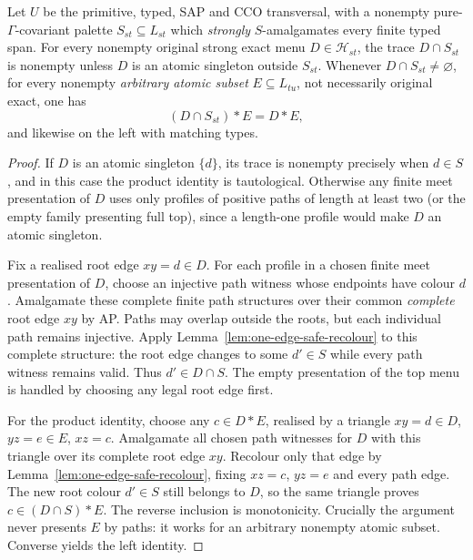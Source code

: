 \begin{lemma}
\label{lem:safe-trace-product}
Let $U$ be the primitive, typed, SAP and CCO transversal,
with a nonempty pure-$\Gamma$-covariant palette
$S_{st}\subseteq L_{st}$ which \emph{strongly}
$S$-amalgamates every finite typed span.
For every nonempty original strong exact menu $D\in\mathcal H_{st}$,
the trace $D\cap S_{st}$ is nonempty unless $D$ is
an atomic singleton outside $S_{st}$.  Whenever
$D\cap S_{st}\ne\varnothing$, for every nonempty
\emph{arbitrary atomic subset} $E\subseteq L_{tu}$, not
necessarily original exact, one has
\[
          (D\cap S_{st})*E=D*E,
\]
and likewise on the left with matching types.
\end{lemma}
\begin{proof}
If $D$ is an atomic singleton $\{d\}$, its trace is
nonempty precisely when $d\in S$, and in this case the
product identity is tautological.  Otherwise any finite
meet presentation of $D$ uses only profiles of positive
paths of length at least two (or the empty family presenting
full top), since a length-one profile would make $D$
an atomic singleton.

Fix a realised root edge $xy=d\in D$.  For each profile in
a chosen finite meet presentation of $D$, choose an injective
path witness whose endpoints have colour $d$.  Amalgamate
these complete finite path structures over their common
\emph{complete} root edge $xy$ by AP.  Paths may overlap
outside the roots, but each individual path remains injective.
Apply Lemma~\ref{lem:one-edge-safe-recolour} to this
complete structure: the root edge changes to some
$d'\in S$ while every path witness remains valid.  Thus
$d'\in D\cap S$.  The empty presentation of the top
menu is handled by choosing any legal root edge first.

For the product identity, choose any $c\in D*E$, realised
by a triangle $xy=d\in D$, $yz=e\in E$, $xz=c$.
Amalgamate all chosen path witnesses for $D$ with this
triangle over its complete root edge $xy$.  Recolour only
that edge by Lemma~\ref{lem:one-edge-safe-recolour},
fixing $xz=c$, $yz=e$ and every path edge.  The new
root colour $d'\in S$ still belongs to $D$, so the
same triangle proves $c\in(D\cap S)*E$.
The reverse inclusion is monotonicity.  Crucially the
argument never presents $E$ by paths: it works for an
arbitrary nonempty atomic subset.  Converse yields the
left identity.
\end{proof}

